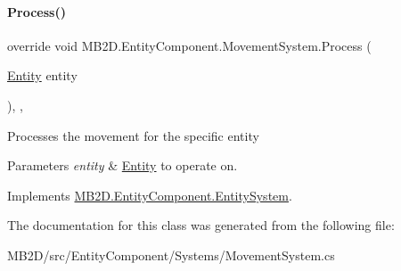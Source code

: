 \paragraph{\texorpdfstring{Process()}{Process()}}
{\footnotesize\ttfamily override void M\+B2\+D.\+Entity\+Component.\+Movement\+System.\+Process (\begin{DoxyParamCaption}\item[{\hyperlink{class_m_b2_d_1_1_entity_component_1_1_entity}{Entity}}]{entity }\end{DoxyParamCaption})\hspace{0.3cm}{\ttfamily [inline]}, {\ttfamily [protected]}, {\ttfamily [virtual]}}



Processes the movement for the specific entity 


\begin{DoxyParams}{Parameters}
{\em entity} & \hyperlink{class_m_b2_d_1_1_entity_component_1_1_entity}{Entity} to operate on.\\
\hline
\end{DoxyParams}


Implements \hyperlink{class_m_b2_d_1_1_entity_component_1_1_entity_system_abbf83b87cb5d12754fb058cef50451fa}{M\+B2\+D.\+Entity\+Component.\+Entity\+System}.



The documentation for this class was generated from the following file\+:\begin{DoxyCompactItemize}
\item 
M\+B2\+D/src/\+Entity\+Component/\+Systems/Movement\+System.\+cs\end{DoxyCompactItemize}
